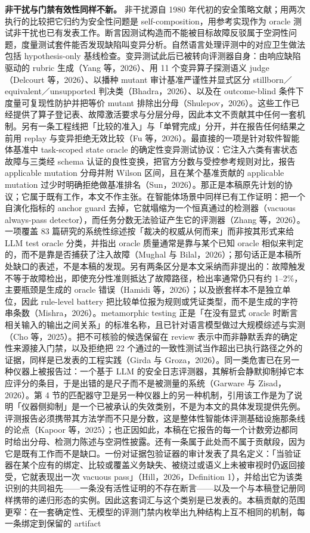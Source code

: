 \documentclass[UTF8,11pt]{ctexart}
\begin{document}
\noindent\textbf{非干扰与门禁有效性同样不新。} 非干扰源自 1980 年代初的安全策略文献；用两次执行的比较把它归约为安全性问题是 self-composition，用参考实现作为 oracle 测试非干扰也已有发表工作。断言因测试构造而不能被目标故障反驳属于空洞性问题，度量测试套件能否发现缺陷叫变异分析。自然语言处理评测中的对应卫生做法包括 hypothesis-only 基线检查。变异测试此后已被转向评测器自身：由响应缺陷驱动的 rubric 生成（Yang 等，2026）、用 11 个变异算子探测语义 judge（Delcourt 等，2026）、以播种 mutant 审计基准严谨性并显式区分 stillborn／equivalent／unsupported 判决类（Bhadra，2026）、以及在 outcome-blind 条件下度量可复现性防护并把等价 mutant 排除出分母（Shulepov，2026）。这些工作已经提供了算子登记表、故障激活要求与分层分母，因此本文不贡献其中任何一套机制。另有一条工程线把「比较的准入」与「单臂完成」分开，并在报告任何结果之前用 replay 与变异拒绝无效比较（Fu 等，2026）。最直接的一项是针对软件智能体基准中 task-scoped state oracle 的确定性变异测试协议：它注入六类有害状态故障与三类经 schema 认证的良性变换，把官方分数与受控参考规则对比，报告 applicable mutation 分母并附 Wilson 区间，且在某个基准贡献的 applicable mutation 过少时明确拒绝做基准排名（Sun，2026）。那正是本稿原先计划的协议；它属于既有工作，本文不作主张。在智能体场景中同样已有工作证明：把一个自演化指标的 anchor guard 去掉，它就塌缩为一个恒真通过的检测器（vacuous always-pass detector），而任务分数无法验证产生它的评测器（Zhang 等，2026）。一项覆盖 83 篇研究的系统性综述按「裁决的权威从何而来」而非按其形式来给 LLM test oracle 分类，并指出 oracle 质量通常是靠与某个已知 oracle 相似来判定的，而不是靠是否捕获了注入故障（Mughal 与 Bilal，2026）；那句话正是本稿所处缺口的表述，不是本稿的发现。另有两条区分是本文采纳而非提出的：故障触发不等于故障检出，即使充分性准则抵达了故障路径，检出率通常仍只有约 1--2\%，主要瓶颈是生成的 oracle 错误（Hamidi 等，2026）；以及嵌套样本不是独立单位，因此 rule-level battery 把比较单位报为规则或凭证类型，而不是生成的字符串条数（Mishra，2026）。metamorphic testing 正是「在没有显式 oracle 时断言相关输入的输出之间关系」的标准名称，且已针对语言模型做过大规模综述与实测（Cho 等，2025）。把不可核验的候选保留在 review 表示中而非静默丢弃的确定性来源接入门禁，以及拒绝把 22 个通过的一致性测试当作超出已执行路径之外的证据，同样是已发表的工程实践（Girda 与 Groza，2026）。同一类危害已在另一种仪器上被报告过：一个基于 LLM 的安全日志评测器，其解析会静默抑制掉它本应评分的条目，于是出错的是尺子而不是被测量的系统（Garware 与 Zisad，2026）。第 4 节的匹配器守卫是另一种仪器上的另一种机制，引用该工作是为了说明「仪器侧抑制」是一个已被承认的失效类别，不是为本文的具体发现提供先例。评测报告必须携带其方法学而不只是分数，这是整体性智能体评测基础设施那条线的论点（Kapoor 等，2025）；也正因如此，本稿在它报告的每一个计数旁边都同时给出分母、检测力陈述与空洞性披露。还有一条属于此处而不属于贡献段，因为它是既有工作而不是缺口。一份对证据包验证器的审计发表了具名定义：「当验证器在某个应有的绑定、比较或覆盖义务缺失、被绕过或语义上未被审视时仍返回接受，它就表现出一次 vacuous pass」（Hill，2026，Definition 1），并给出它为该类识别的共同祖先——一条没有活性证明的不存在断言——以及一个与本稿登记册同样携带的递归形态的实例。因此这套词汇与这个类别是已发表的。本稿贡献的范围更窄：在一套确定性、无模型的评测门禁内枚举出九种结构上互不相同的机制，每一条绑定到保留的 artifact 
\end{document}
